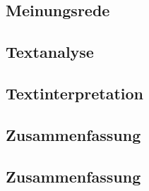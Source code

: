 \begin{spacing}{1}
	\chapter{Meinungsrede}\label{chapter:introduction}
\end{spacing}


\begin{spacing}{1}
	\chapter{Textanalyse}\label{chapter:introduction}
\end{spacing}


\begin{spacing}{1}
	\chapter{Textinterpretation}\label{chapter:introduction}
\end{spacing}


\begin{spacing}{1}
	\chapter{Zusammenfassung}\label{chapter:introduction}
\end{spacing}


\begin{spacing}{1}
	\chapter{Zusammenfassung}
\end{spacing}






